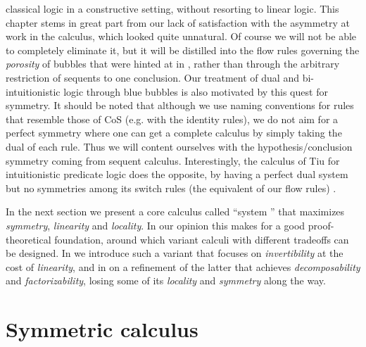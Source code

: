 \begin{description}
    classical logic in a constructive setting, without resorting to linear
    logic. This chapter stems in great part from our lack of satisfaction with
    the asymmetry at work in the  calculus, which looked quite
    unnatural. Of course we will not be able to completely eliminate it, but it
    will be distilled into the flow rules governing the \emph{porosity} of
    bubbles that were hinted at in , rather than through the
    arbitrary restriction of sequents to one conclusion. Our treatment of dual and bi-intuitionistic logic through
    blue bubbles is also motivated by this quest for symmetry. It should be
    noted that although we use naming conventions for rules that resemble those
    of CoS (e.g. with the identity rules), we do not aim for a perfect symmetry
    where one can get a complete calculus by simply taking the dual of each
    rule. Thus we
    will content ourselves with the hypothesis/conclusion symmetry coming from
    sequent calculus. Interestingly, the calculus  of Tiu for
    intuitionistic predicate logic does the opposite, by having a perfect dual
    system  but no symmetries among its switch rules (the equivalent
    of our flow rules) \cite{tiu_local_2006}.
\end{description}

In the next section we present a core calculus called ``system '' that
maximizes \emph{symmetry}, \emph{linearity} and \emph{locality}. In our opinion
this makes for a good proof-theoretical foundation, around which variant calculi
with different tradeoffs can be designed. In  we
introduce such a variant that focuses on \emph{invertibility} at the cost of
\emph{linearity}, and in  on a refinement of the
latter that achieves \emph{decomposability} and \emph{factorizability}, losing
some of its \emph{locality} and \emph{symmetry} along the way.

\section{Symmetric calculus}

